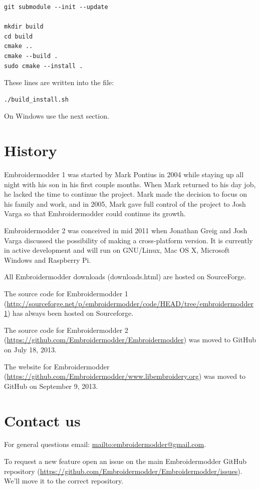 \documentclass[10pt]{report}
\begin{document}
\begin{lstlisting}
git submodule --init --update

mkdir build
cd build
cmake ..
cmake --build .
sudo cmake --install .
\end{lstlisting}

These lines are written into the file:

\begin{lstlisting}
./build_install.sh
\end{lstlisting}

On Windows use the next section.

\section{History}

Embroidermodder 1 was started by Mark Pontius in 2004 while staying up all night
with his son in his first couple months. When Mark returned to his day job, he
lacked the time to continue the project. Mark made the decision to focus on his
family and work, and in 2005, Mark gave full control of the project to Josh
Varga so that Embroidermodder could continue its growth.

Embroidermodder 2 was conceived in mid 2011 when Jonathan Greig and Josh Varga
discussed the possibility of making a cross-platform version. It is currently in
active development and will run on GNU/Linux, Mac OS X, Microsoft Windows and
Raspberry Pi.

All Embroidermodder downloads (downloads.html) are hosted on SourceForge.

The source code for Embroidermodder 1
(\url{http://sourceforge.net/p/embroidermodder/code/HEAD/tree/embroidermodder1})
has always been hosted on Sourceforge.

The source code for Embroidermodder 2
(\url{https://github.com/Embroidermodder/Embroidermodder}) was moved to GitHub
on July 18, 2013.

The website for Embroidermodder
(\url{https://github.com/Embroidermodder/www.libembroidery.org}) was moved to
GitHub on September 9, 2013.

\section{Contact us}

For general questions email: \url{mailto:embroidermodder@gmail.com}.

To request a new feature  open an issue on the main Embroidermodder GitHub
repository (\url{https://github.com/Embroidermodder/Embroidermodder/issues}).
We'll move it to the correct repository.
\end{document}
